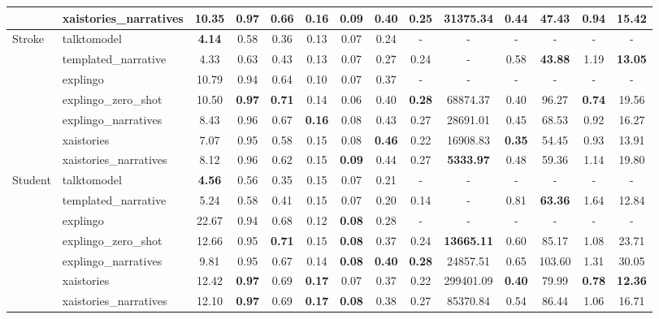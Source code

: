 \begin{table}[th!]
{\begin{tabular}{llcccccccccccc}
     & xaistories\_narratives & 10.35 & \textbf{0.97} & \textbf{0.66} & 0.16 & \textbf{0.09} & 0.40 & 0.25 & \textbf{31375.34} & 0.44 & 47.43 & 0.94 & 15.42\\
    \midrule
    \multirow{7}{*}{Stroke} & talktomodel & \textbf{4.14} & 0.58 & 0.36 & 0.13 & 0.07 & 0.24 & - & - & - & - & - & -\\
     & templated\_narrative & 4.33 & 0.63 & 0.43 & 0.13 & 0.07 & 0.27 & 0.24 & - & 0.58 & \textbf{43.88} & 1.19 & \textbf{13.05}\\
     & explingo & 10.79 & 0.94 & 0.64 & 0.10 & 0.07 & 0.37 & - & - & - & - & - & -\\
     & explingo\_zero\_shot & 10.50 & \textbf{0.97} & \textbf{0.71} & 0.14 & 0.06 & 0.40 & \textbf{0.28} & 68874.37 & 0.40 & 96.27 & \textbf{0.74} & 19.56\\
     & explingo\_narratives & 8.43 & 0.96 & 0.67 & \textbf{0.16} & 0.08 & 0.43 & 0.27 & 28691.01 & 0.45 & 68.53 & 0.92 & 16.27\\
     & xaistories & 7.07 & 0.95 & 0.58 & 0.15 & 0.08 & \textbf{0.46} & 0.22 & 16908.83 & \textbf{0.35} & 54.45 & 0.93 & 13.91\\
     & xaistories\_narratives & 8.12 & 0.96 & 0.62 & 0.15 & \textbf{0.09} & 0.44 & 0.27 & \textbf{5333.97} & 0.48 & 59.36 & 1.14 & 19.80\\
    \midrule
    \multirow{7}{*}{Student} & talktomodel & \textbf{4.56} & 0.56 & 0.35 & 0.15 & 0.07 & 0.21 & - & - & - & - & - & -\\
     & templated\_narrative & 5.24 & 0.58 & 0.41 & 0.15 & 0.07 & 0.20 & 0.14 & - & 0.81 & \textbf{63.36} & 1.64 & 12.84\\
     & explingo & 22.67 & 0.94 & 0.68 & 0.12 & \textbf{0.08} & 0.28 & - & - & - & - & - & -\\
     & explingo\_zero\_shot & 12.66 & 0.95 & \textbf{0.71} & 0.15 & \textbf{0.08} & 0.37 & 0.24 & \textbf{13665.11} & 0.60 & 85.17 & 1.08 & 23.71\\
     & explingo\_narratives & 9.81 & 0.95 & 0.67 & 0.14 & \textbf{0.08} & \textbf{0.40} & \textbf{0.28} & 24857.51 & 0.65 & 103.60 & 1.31 & 30.05\\
     & xaistories & 12.42 & \textbf{0.97} & 0.69 & \textbf{0.17} & 0.07 & 0.37 & 0.22 & 299401.09 & \textbf{0.40} & 79.99 & \textbf{0.78} & \textbf{12.36}\\
     & xaistories\_narratives & 12.10 & \textbf{0.97} & 0.69 & \textbf{0.17} & \textbf{0.08} & 0.38 & 0.27 & 85370.84 & 0.54 & 86.44 & 1.06 & 16.71\\
    \bottomrule
    \end{tabular}
}
\end{table}
